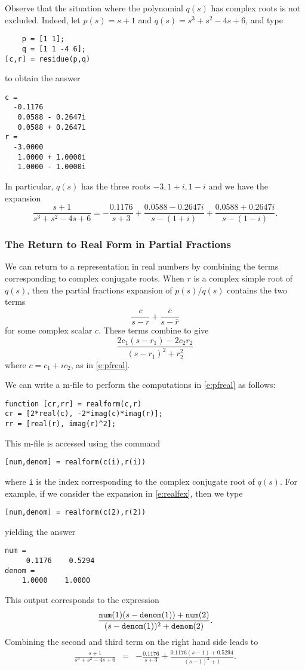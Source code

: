 \documentclass{ximera}
\begin{document}
Observe that the situation where the polynomial $q(s)$ has complex roots 
is not excluded.  Indeed, let $p(s) = s+1$ and $q(s) = s^3+s^2-4s+6$, and type
\begin{verbatim}
    p = [1 1];
    q = [1 1 -4 6];
[c,r] = residue(p,q)
\end{verbatim}
to obtain the answer
\begin{verbatim}
c =
  -0.1176          
   0.0588 - 0.2647i
   0.0588 + 0.2647i
r =
  -3.0000          
   1.0000 + 1.0000i
   1.0000 - 1.0000i
\end{verbatim}
In particular, $q(s)$ has the three roots $-3,1+i,1-i$ and we have
the expansion
\begin{equation}   \label{e:realfex}
\frac{s+1}{s^3+s^2-4s+6} = -\frac{0.1176}{s+3}+\frac{0.0588 - 0.2647i}{s-(1+i)}+
\frac{0.0588 + 0.2647i}{s-(1-i)}.
\end{equation}

\subsubsection*{The Return to Real Form in Partial Fractions}

We can return to a representation in real numbers by combining the terms 
corresponding to complex conjugate roots.  When $r$ is a complex simple root 
of $q(s)$, then the partial fractions expansion of $p(s)/q(s)$ contains 
the two terms
\[
\frac{c}{s-r} + \frac{\overline{c}}{s-\overline{r}}
\]
for some complex scalar $c$.  These terms combine to give
\[
\frac{2c_1(s-r_1)-2c_2r_2}{(s-r_1)^2+r_2^2}
\]
where $c=c_1+ic_2$, as in \eqref{e:pfreal}.

We can write a \Matlab m-file to perform the computations in \eqref{e:pfreal}
as follows:
\begin{verbatim}
function [cr,rr] = realform(c,r)
cr = [2*real(c), -2*imag(c)*imag(r)];
rr = [real(r), imag(r)^2];
\end{verbatim}
This m-file is accessed using the command 
\begin{verbatim}
[num,denom] = realform(c(i),r(i))
\end{verbatim}
where {\tt i} is the index corresponding to the complex conjugate root of 
$q(s)$.  For example, if we consider the expansion in \eqref{e:realfex}, then we 
type 
\begin{verbatim}
[num,denom] = realform(c(2),r(2))
\end{verbatim}
yielding the answer
\begin{verbatim}
num =
     0.1176    0.5294
denom = 
    1.0000    1.0000
\end{verbatim}
This output corresponds to the expression
\[
\frac{{\tt num}(1)(s-{\tt denom}(1)) + {\tt num}(2)}{(s-{\tt denom}(1))^2 + 
{\tt denom}(2)}.
\]
Combining the second and third term on the right hand side leads to
\begin{eqnarray*}
\frac{s+1}{s^3+s^2-4s+6} & = & 
-\frac{0.1176}{s+3} + \frac{0.1176(s-1)+0.5294}{(s-1)^2+1}.
\end{eqnarray*}
\end{document}
